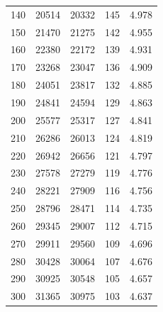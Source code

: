 \documentclass[%
 reprint,
nofootinbib,
 amsmath,amssymb,
 aps,
floatfix,
]{revtex4-2}
\begin{document}
\begin{table}[]
\begin{tabular}{@{}ccccc@{}}
        140              & 20514  & 20332            & 145                      & 4.978 \\
        150              & 21470  & 21275            & 142                      & 4.955 \\
        160              & 22380  & 22172            & 139                      & 4.931 \\
        170              & 23268  & 23047            & 136                      & 4.909 \\
        180              & 24051  & 23817            & 132                      & 4.885 \\
        190              & 24841  & 24594            & 129                      & 4.863 \\
        200              & 25577  & 25317            & 127                      & 4.841 \\
        210              & 26286  & 26013            & 124                      & 4.819 \\
        220              & 26942  & 26656            & 121                      & 4.797 \\
        230              & 27578  & 27279            & 119                      & 4.776 \\
        240              & 28221  & 27909            & 116                      & 4.756 \\
        250              & 28796  & 28471            & 114                      & 4.735 \\
        260              & 29345  & 29007            & 112                      & 4.715 \\
        270              & 29911  & 29560            & 109                      & 4.696 \\
        280              & 30428  & 30064            & 107                      & 4.676 \\
        290              & 30925  & 30548            & 105                      & 4.657 \\
        300              & 31365  & 30975            & 103                      & 4.637 \\ \bottomrule
        \end{tabular}
        \end{table}
\end{document}
